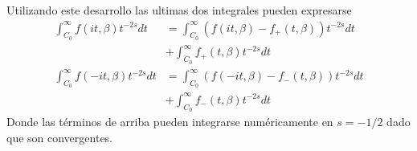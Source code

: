 Utilizando este desarrollo las ultimas dos integrales pueden expresarse
\begin{align}
\nonumber
	\int _{C _0} ^{\infty}
			f (i t,\beta )
			t ^{-2s}  dt &= 
	\int _{C _0} ^{\infty}
		\left(
			f (it, \beta) - f _{+} (t, \beta )			
				\right) t ^{-2s} dt 
	\\ &+ 
\nonumber
	\int _{C _0} ^{\infty}
			f _{+} ( t, \beta)
			 t ^{-2s} dt  \\
\nonumber
	\int _{C _0} ^{\infty}
			f (-i t,\beta )
			t ^{-2s}  dt &= 
	\int _{C _0} ^{\infty}
		\left(
			f (-it, \beta) - f _{-} (t, \beta )			
				\right) t ^{-2s} dt 
	\\ &+ 
\nonumber
	\int _{C _0} ^{\infty}
			f _{-} ( t, \beta)
			 t ^{-2s} dt
\end{align}
Donde las términos de arriba pueden integrarse numéricamente en $s=-1/2$ dado que son convergentes. 

